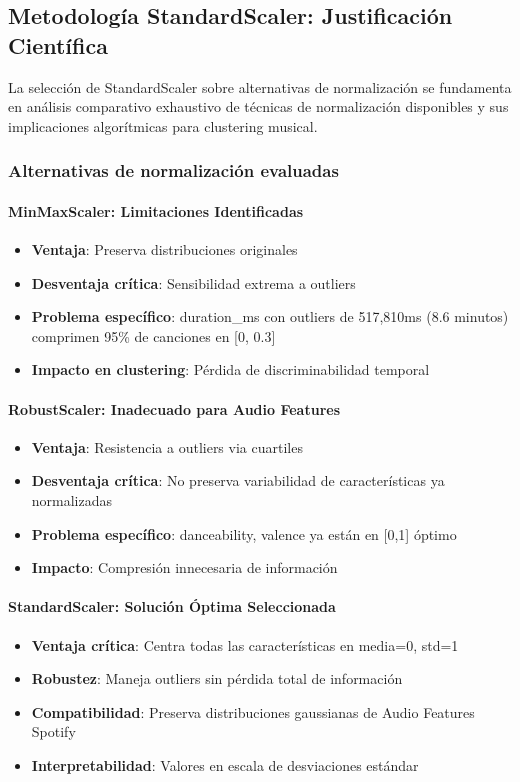 \documentclass[12pt,a4paper]{report}
\begin{document}
\subsection{Metodología StandardScaler: Justificación Científica}

La selección de StandardScaler sobre alternativas de normalización se fundamenta en análisis comparativo exhaustivo de técnicas de normalización disponibles y sus implicaciones algorítmicas para clustering musical.

\subsubsection{Alternativas de normalización evaluadas}

\paragraph{MinMaxScaler: Limitaciones Identificadas}
\begin{itemize}
    \item \textbf{Ventaja}: Preserva distribuciones originales
    \item \textbf{Desventaja crítica}: Sensibilidad extrema a outliers
    \item \textbf{Problema específico}: duration\_ms con outliers de 517,810ms (8.6 minutos) comprimen 95\% de canciones en [0, 0.3]
    \item \textbf{Impacto en clustering}: Pérdida de discriminabilidad temporal
\end{itemize}

\paragraph{RobustScaler: Inadecuado para Audio Features}
\begin{itemize}
    \item \textbf{Ventaja}: Resistencia a outliers via cuartiles
    \item \textbf{Desventaja crítica}: No preserva variabilidad de características ya normalizadas
    \item \textbf{Problema específico}: danceability, valence ya están en [0,1] óptimo
    \item \textbf{Impacto}: Compresión innecesaria de información
\end{itemize}

\paragraph{StandardScaler: Solución Óptima Seleccionada}
\begin{itemize}
    \item \textbf{Ventaja crítica}: Centra todas las características en media=0, std=1
    \item \textbf{Robustez}: Maneja outliers sin pérdida total de información
    \item \textbf{Compatibilidad}: Preserva distribuciones gaussianas de Audio Features Spotify
    \item \textbf{Interpretabilidad}: Valores en escala de desviaciones estándar
\end{itemize}
\end{document}
